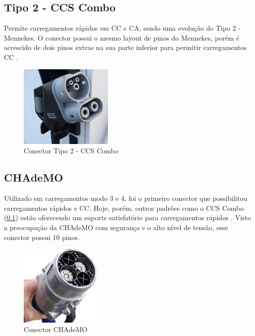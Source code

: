       \subsection{Tipo 2 - CCS Combo}
      \label{stateofart:plugs:combo}

        Permite carregamentos rápidos em \ac{CC} e \ac{CA}, sendo uma evolução do Tipo 2 - Mennekes. O conector possui o mesmo layout de pinos do Mennekes, porém é acrescido de dois pinos extras na sua parte inferior para permitir carregamentos \ac{CC} \cite{ieee-review-evse}.

        \begin{figure}[H]
          \begin{center}
            \includegraphics[width=0.40\textwidth,natwidth=1024,natheight=973]{assets/images/connectors-combo.jpg}
            \caption{Conector Tipo 2 - CCS Combo}
            \label{fig:combo}
          \end{center}
        \end{figure}

      \subsection{CHAdeMO}
      \label{stateofart:plugs:chademo}

        Utilizado em carregamentos modo 3 e 4, foi o primeiro conector que possibilitou carregamentos rápidos e \ac{CC}. Hoje, porém, outros padrões como o CCS Combo (\ref{stateofart:plugs:combo}) estão oferecendo um suporte satisfatório para carregamentos rápidos \cite{ieee-review-evse}. Visto a preocupação da CHAdeMO com segurança e o alto nível de tensão, esse conector possui 10 pinos.

        \begin{figure}[H]
          \begin{center}
            \includegraphics[width=0.35\textwidth,natwidth=300,natheight=300]{assets/images/connectors-chademo.jpg}
            \caption{Conector CHAdeMO}
            \label{fig:chademo}
          \end{center}
        \end{figure}

